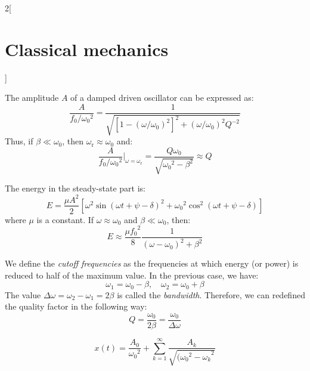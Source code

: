 \documentclass[../../../main_physics.tex]{subfiles}
\begin{document}
\begin{multicols}{2}[\section{Classical mechanics}]
\begin{proposition}
    The amplitude $A$ of a damped driven oscillator can be expressed as:
    $$\frac{A}{f_0/{\omega_0}^2}=\frac{1}{\sqrt{{\left[1-{\left(\omega/\omega_0\right)}^2\right]}^2+{\left(\omega/\omega_0\right)}^2Q^{-2}}}$$
    Thus, if $\beta\ll \omega_0$, then $\omega_\text{r}\approx\omega_0$ and: $$\frac{A}{f_0/{\omega_0}^2}\bigg|_{\omega=\omega_\text{r}}=\frac{Q\omega_0}{\sqrt{{\omega_0}^2-\beta^2}}\approx Q$$
    \begin{center}
      \begin{minipage}{\linewidth}
        \centering
        
      \end{minipage}
    \end{center}
  \end{proposition}
  \begin{proposition}
    The energy in the steady-state part is:
    $$E=\frac{\mu A^2}{2}\left[\omega^2{\sin(\omega t+\psi-\delta)}^2+{\omega_0}^2\cos^2(\omega t+\psi-\delta)\right]$$ where $\mu$ is a constant. If $\omega\approx\omega_0$ and $\beta\ll\omega_0$, then: $$E\approx\frac{\mu {f_0}^2}{8}\frac{1}{(\omega-\omega_0)^2+\beta^2}$$
  \end{proposition}
  \begin{definition}
    We define the \emph{cutoff frequencies} as the frequencies at which energy (or power) is reduced to half of the maximum value. In the previous case, we have: $$\omega_1=\omega_0-\beta,\quad\omega_2=\omega_0+\beta$$ The value  $\Delta\omega=\omega_2-\omega_1=2\beta$ is called the \emph{bandwidth}. Therefore, we can redefined the quality factor in the following way: $$Q=\frac{\omega_0}{2\beta}=\frac{\omega_0}{\Delta\omega}$$
  \end{definition}
  \begin{center}
    \begin{minipage}{\linewidth}
      \centering
      
    \end{minipage}
  \end{center}
  \begin{proposition}
    $$x(t)=\frac{A_0}{{\omega_0}^2}+\sum_{k=1}^\infty\frac{A_k}{\sqrt{{({\omega_0}^2-\omega_k}^2}}$$
  \end{proposition}
  \begin{proposition}

\end{proposition}
\end{multicols}
\end{document}
